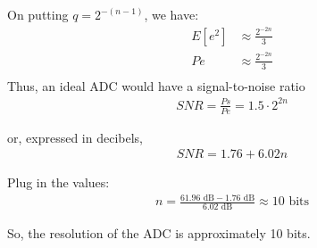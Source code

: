 \documentclass[journal,12pt,onecolumn]{IEEEtran}
\begin{document}
On putting \(q = 2^{-(n-1)}\), we have:
\begin{align}
E[e^{2}] &\approx \frac{2^{-2n}}{3}\\
Pe &\approx \frac{2^{-2n}}{3}\\
\end{align}
Thus, an ideal ADC would have a signal-to-noise ratio
\begin{align}
SNR = \frac{Ps}{Pe} = 1.5 \cdot 2^{2n}
\end{align}

or, expressed in decibels,
\begin{align}
SNR = 1.76 + 6.02n
\end{align}

Plug in the values:
\begin{align}
n = \frac{61.96 \text{ dB} - 1.76 \text{ dB}}{6.02 \text{ dB}} \approx 10 \text{ bits}
\end{align}

So, the resolution of the ADC is approximately 10 bits.\\
\end{document}
